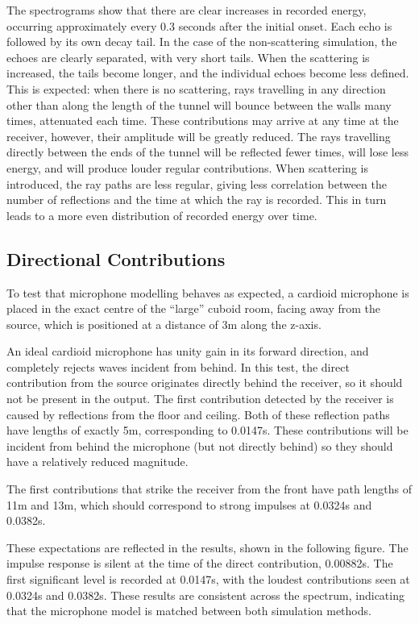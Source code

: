 \documentclass[]{scrreprt}
\begin{document}
The spectrograms show that there are clear increases in recorded energy,
occurring approximately every 0.3 seconds after the initial onset. Each
echo is followed by its own decay tail. In the case of the
non-scattering simulation, the echoes are clearly separated, with very
short tails. When the scattering is increased, the tails become longer,
and the individual echoes become less defined. This is expected: when
there is no scattering, rays travelling in any direction other than
along the length of the tunnel will bounce between the walls many times,
attenuated each time. These contributions may arrive at any time at the
receiver, however, their amplitude will be greatly reduced. The rays
travelling directly between the ends of the tunnel will be reflected
fewer times, will lose less energy, and will produce louder regular
contributions. When scattering is introduced, the ray paths are less
regular, giving less correlation between the number of reflections and
the time at which the ray is recorded. This in turn leads to a more even
distribution of recorded energy over time.

\subsection{Directional Contributions}\label{directional-contributions}

To test that microphone modelling behaves as expected, a cardioid
microphone is placed in the exact centre of the ``large'' cuboid room,
facing away from the source, which is positioned at a distance of 3m
along the z-axis.

An ideal cardioid microphone has unity gain in its forward direction,
and completely rejects waves incident from behind. In this test, the
direct contribution from the source originates directly behind the
receiver, so it should not be present in the output. The first
contribution detected by the receiver is caused by reflections from the
floor and ceiling. Both of these reflection paths have lengths of
exactly 5m, corresponding to 0.0147s. These contributions will be
incident from behind the microphone (but not directly behind) so they
should have a relatively reduced magnitude.

The first contributions that strike the receiver from the front have
path lengths of 11m and 13m, which should correspond to strong impulses
at 0.0324s and 0.0382s.

These expectations are reflected in the results, shown in the following
figure\text{ (\ref{fig:cardioid})}. The impulse response is silent at
the time of the direct contribution, 0.00882s. The first significant
level is recorded at 0.0147s, with the loudest contributions seen at
0.0324s and 0.0382s. These results are consistent across the spectrum,
indicating that the microphone model is matched between both simulation
methods.
\end{document}
